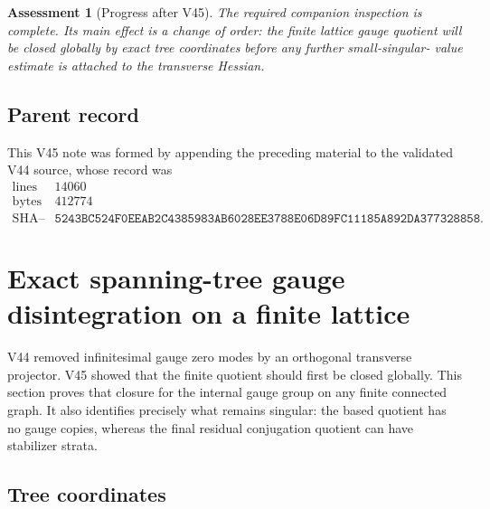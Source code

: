 \documentclass[11pt]{article}
\newtheorem{assessment}[theorem]{Assessment}
\begin{document}
\begin{assessment}[Progress after V45]
\label{ass:v11v45-status}
The required companion inspection is complete.  Its main effect is a
change of order: the finite lattice gauge quotient will be closed
globally by exact tree coordinates before any further small-singular-
value estimate is attached to the transverse Hessian.
\end{assessment}

\subsection{Parent record}

This V45 note was formed by appending the preceding material to the
validated V44 source, whose record was
\[
\begin{array}{c|c}
\text{lines}&14060\\
\text{bytes}&412774\\
\text{SHA--256}&
\texttt{5243BC524F0EEAB2C4385983AB6028EE3788E06D89FC11185A892DA377328858}.
\end{array}                                                     \tag{45.11}
\]


\section{Exact spanning-tree gauge disintegration on a finite lattice}
\label{sec:v11v46}

V44 removed infinitesimal gauge zero modes by an orthogonal transverse
projector.  V45 showed that the finite quotient should first be closed
globally.  This section proves that closure for the internal gauge
group on any finite connected graph.  It also identifies precisely
what remains singular: the based quotient has no gauge copies, whereas
the final residual conjugation quotient can have stabilizer strata.

\subsection{Tree coordinates}
\end{document}

